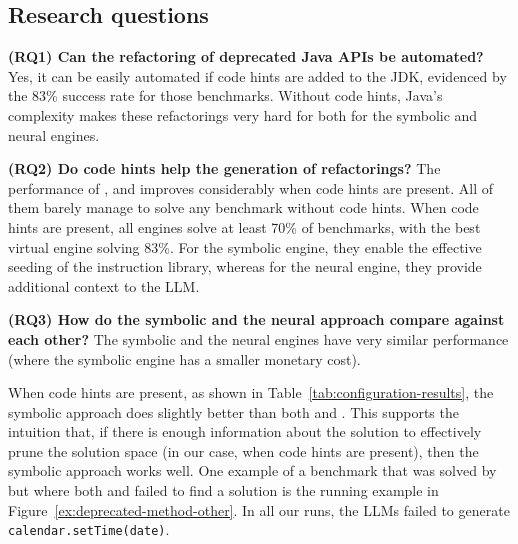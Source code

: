 \documentclass[sigconf,review,anonymous]{acmart}
\begin{document}
\subsection{Research questions}

{\bf (RQ1) Can the refactoring of deprecated Java APIs be automated?}
%
Yes, it can be easily automated if code hints are added to the JDK,
evidenced by the 83\% success rate for those benchmarks.  Without code
hints, Java's complexity makes these refactorings very hard for both for the
symbolic and neural engines.

\noindent
{\bf (RQ2) Do code hints help the generation of refactorings?}
%
The performance of \tool, \llma and \llmb improves considerably when code
hints are present.  All of them barely manage to solve any benchmark without
code hints.  When code hints are present, all engines solve at least 70\% of
benchmarks, with the best virtual engine solving 83\%.  For the symbolic
engine, they enable the effective seeding of the instruction library,
whereas for the neural engine, they provide additional context to the LLM.

\noindent
{\bf (RQ3) How do the symbolic and the neural approach compare against each other?}
%
The symbolic and the neural engines have very similar performance (where the symbolic engine has a smaller monetary cost).



When code hints are present, as shown in
Table~\ref{tab:configuration-results}, the symbolic approach does slightly
better than both \llma and \llmb.  This supports the intuition that, if
there is enough information about the solution to effectively prune the
solution space (in our case, when code hints are present),
%
then the symbolic approach works well. %
%
One example of a benchmark that was solved by \tool but where both \llma and
\llmb failed to find a solution is the running example in
Figure~\ref{ex:deprecated-method-other}.  In all our runs, the LLMs failed
to generate \lstinline[breaklines=true]{calendar.setTime(date)}.
\end{document}
